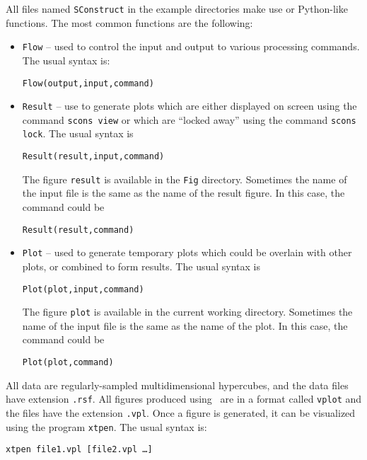 All files named \texttt{SConstruct} in the example directories make
use or Python-like functions. The most common functions are the
following:
\begin{itemize}
\item \texttt{Flow} -- used to control the input and output to various
  processing commands. The usual syntax is:
  \begin{center}
    \texttt{Flow(output,input,command)}
  \end{center}

\item \texttt{Result} -- use to generate plots which are either
  displayed on screen using the command \texttt{scons view} or which
  are ``locked away'' using the command \texttt{scons lock}. The usual
  syntax is
  \begin{center}
    \texttt{Result(result,input,command)}
  \end{center}
  The figure \texttt{result} is available in the \texttt{Fig}
  directory. Sometimes the name of the input file is the same as the
  name of the result figure. In this case, the command could be
  \begin{center}
    \texttt{Result(result,command)}
  \end{center}
  
\item \texttt{Plot} -- used to generate temporary plots which could be
  overlain with other plots, or combined to form results.  The usual
  syntax is
  \begin{center}
    \texttt{Plot(plot,input,command)}
  \end{center}
  The figure \texttt{plot} is available in the current working
  directory.  Sometimes the name of the input file is the same as the
  name of the plot. In this case, the command could be
  \begin{center}
    \texttt{Plot(plot,command)}
  \end{center}

\end{itemize}

All \mg data are regularly-sampled multidimensional hypercubes, and
the data files have extension \texttt{.rsf}. All figures produced
using \mg~are in a format called \texttt{vplot} and the files have the
extension \texttt{.vpl}. Once a figure is generated, it can be
visualized using the program \texttt{xtpen}.  The usual syntax is:
  \begin{center}
    \texttt{xtpen file1.vpl [file2.vpl \dots]}
  \end{center}
 
